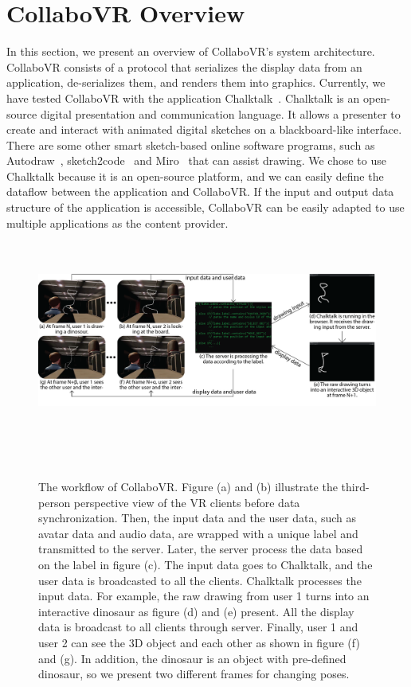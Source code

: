 \documentclass{sigchi}
\begin{document}
\section{CollaboVR Overview}
In this section, we present an overview of CollaboVR's system architecture. CollaboVR consists of a protocol that serializes the display data from an application, de-serializes them, and renders them into graphics. Currently, we have tested CollaboVR with the application Chalktalk~\cite{perlin2018chalktalk}. Chalktalk is an open-source digital presentation and communication language. It allows a presenter to create and interact with animated digital sketches on a blackboard-like interface. There are some other smart sketch-based online software programs, such as Autodraw~\cite{Autodraw}, sketch2code~\cite{Sketch2code} and Miro~\cite{Miro} that can assist drawing. We chose to use Chalktalk because it is an open-source platform, and we can easily define the dataflow between the application and CollaboVR. If the input and output data structure of the application is accessible, CollaboVR can be easily adapted to use multiple applications as the content provider.

\begin{figure}[ht!]
 \centering
 \includegraphics[height = 6.5cm]{Figure2.png}
 \caption{The workflow of CollaboVR. Figure (a) and (b) illustrate the third-person perspective view of the VR clients before data synchronization. Then, the input data and the user data, such as avatar data and audio data, are wrapped with a unique label and transmitted to the server. Later, the server process the data based on the label in figure (c). The input data goes to Chalktalk, and the user data is broadcasted to all the clients. Chalktalk processes the input data. For example, the raw drawing from user 1 turns into an interactive dinosaur as figure (d) and (e) present. All the display data is broadcast to all clients through server. Finally, user 1 and user 2 can see the 3D object and each other as shown in figure (f) and (g). In addition, the dinosaur is an object with pre-defined dinosaur, so we present two different frames for changing poses.}
 ~\label{fig:workflow}
\end{figure}
\end{document}
